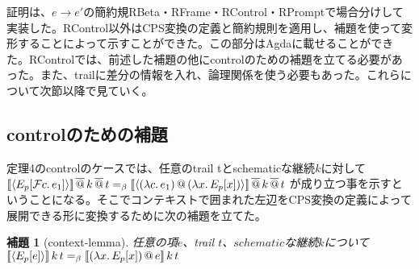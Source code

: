 \documentclass[japanese,draft]{jssst_ppl} %
\newtheorem{lemma}[definition]{補題}
\begin{document}
証明は、$e \to e'$の簡約規\textsf{RBeta}・\textsf{RFrame}・\textsf{RControl}・\textsf{RPrompt}で場合分けして実装した。\textsf{RControl}以外はCPS変換の定義と簡約規則を適用し、補題を使って変形することによって示すことができた。この部分はAgdaに載せることができた。\textsf{RControl}では、前述した補題の他にcontrolのための補題を立てる必要があった。また、trailに差分の情報を入れ、論理関係を使う必要もあった。これらについて次節以降で見ていく。


\subsection{controlのための補題}
定理4のcontrolのケースでは、任意のtrail tとschematicな継続$k$に対して\\
$[\![{\langle{E_p[{\cal F}{c}.\,{e_1}]}\rangle}]\!]\,\overline{@}\, k \,\overline{@}\, t =_{\beta} [\![{\langle{{(\lambda{c}.\,{e_1})}\,@\,{(\lambda{x}.\,{E_p[x]})}}\rangle}]\!] \,\overline{@}\, k \,\overline{@}\, t$ が成り立つ事を示すということになる。そこでコンテキストで囲まれた左辺をCPS変換の定義によって展開できる形に変換するために次の補題を立てた。

\begin{lemma}[context-lemma]
  任意の項$e$、\textsf{trail} $t$、$schematic$な継続$k$について\\
  $[\![{\langle{E_p[e]}\rangle}]\!]\,k\,t =_{\beta} [\![{{(\lambda{x}.\,{E_p[x]})}\,@\,{e}}]\!]\,k\,t$
\end{lemma}
\end{document}
